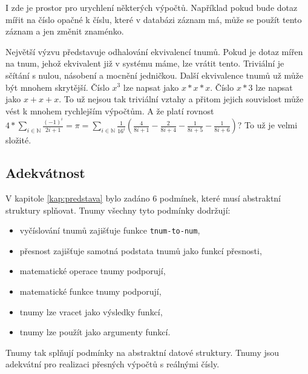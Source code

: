 I zde je prostor pro urychlení některých výpočtů. Například pokud bude dotaz mířit na číslo opačné k číslu, které v databázi záznam má, může se použít tento záznam a jen změnit znaménko.

Největší výzvu představuje odhalování ekvivalencí tnumů. Pokud je dotaz mířen na tnum, jehož ekvivalent již v systému máme, lze vrátit tento. Triviální je sčítání s nulou, násobení a mocnění jedničkou. Další ekvivalence tnumů už může být mnohem skrytější. Číslo $x^3$ lze napsat jako $x*x*x$. Číslo $x*3$ lze napsat jako $x+x+x$. To už nejsou tak triviální vztahy a přitom jejich souvislost může vést k mnohem rychlejším výpočtům. A že platí rovnost $4*\sum_{i\in\mathbb{N}}\frac{(-1)^i}{2i+1}=\pi=\sum_{i\in\mathbb{N}}\frac{1}{16^i}(\frac{4}{8i+1}-\frac{2}{8i+4}-\frac{1}{8i+5}-\frac{1}{8i+6})$? To už je velmi složité.

\subsection{Adekvátnost} V kapitole \ref{kap:predstava} bylo zadáno 6 podmínek, které musí abstraktní struktury splňovat. Tnumy všechny tyto podmínky dodržují:
\begin{itemize}
\item{vyčíslování tnumů zajišťuje funkce \texttt{tnum-to-num},}
\item{přesnost zajišťuje samotná podstata tnumů jako funkcí přesnosti,}
\item{matematické operace tnumy podporují,}
\item{matematické funkce tnumy podporují,}
\item{tnumy lze vracet jako výsledky funkcí,}
\item{tnumy lze použít jako argumenty funkcí.}
\end{itemize}
Tnumy tak splňují podmínky na abstraktní datové struktury. Tnumy jsou adekvátní pro realizaci přesných výpočtů s reálnými čísly.